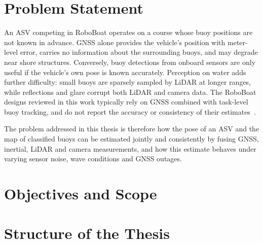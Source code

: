 \section{Problem Statement}
\label{sec:introduction-problem-statement}
An ASV competing in RoboBoat operates on a course whose buoy positions are not
known in advance. GNSS alone provides the vehicle's position with meter-level
error, carries no information about the surrounding buoys, and may degrade
near shore structures. Conversely, buoy detections from onboard sensors are
only useful if the vehicle's own pose is known accurately. Perception on water
adds further difficulty: small buoys are sparsely sampled by LiDAR at longer
ranges, while reflections and glare corrupt both LiDAR and camera data. The
RoboBoat designs reviewed in this work typically rely on GNSS combined with
task-level buoy tracking, and do not report the accuracy or consistency of
their estimates~\cite{TODO}.

The problem addressed in this thesis is therefore how the pose of an ASV and
the map of classified buoys can be estimated jointly and consistently by
fusing GNSS, inertial, LiDAR and camera measurements, and how this estimate
behaves under varying sensor noise, wave conditions and GNSS outages.


\section{Objectives and Scope}
\label{sec:introduction-objectives}



\section{Structure of the Thesis}
\label{sec:introduction-structure}


